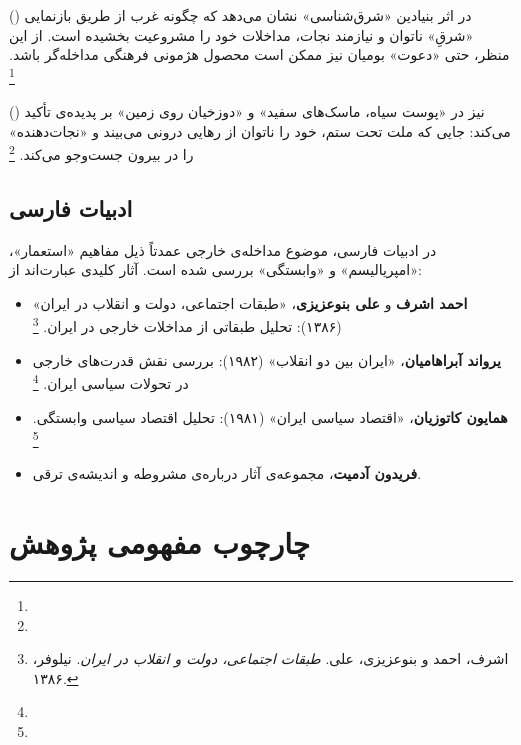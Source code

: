  () در اثر بنیادین «شرق‌شناسی» نشان می‌دهد که چگونه غرب از طریق بازنمایی «شرقِ» ناتوان و نیازمند نجات، مداخلات خود را مشروعیت بخشیده است. از این منظر، حتی «دعوت» بومیان نیز ممکن است محصول هژمونی فرهنگی مداخله‌گر باشد.%
\footnote{}

 () نیز در «پوست سیاه، ماسک‌های سفید» و «دوزخیان روی زمین» بر پدیده‌ی  تأکید می‌کند: جایی که ملت تحت ستم، خود را ناتوان از رهایی درونی می‌بیند و «نجات‌دهنده» را در بیرون جست‌وجو می‌کند.%
\footnote{}

\subsection{ادبیات فارسی}
\label{subsec:ch01-lit-persian}

در ادبیات فارسی، موضوع مداخله‌ی خارجی عمدتاً ذیل مفاهیم «استعمار»، «امپریالیسم» و «وابستگی» بررسی شده است. آثار کلیدی عبارت‌اند از:

\begin{itemize}[nosep, rightmargin=1em]
  \item \textbf{احمد اشرف} و \textbf{علی بنوعزیزی}،  «طبقات اجتماعی، دولت و انقلاب در ایران» (۱۳۸۶): تحلیل طبقاتی از مداخلات خارجی در ایران.%
  \footnote{اشرف، احمد و بنوعزیزی، علی. \textit{طبقات اجتماعی، دولت و انقلاب در ایران}. نیلوفر، ۱۳۸۶.}
  \item \textbf{یرواند آبراهامیان}، «ایران بین دو انقلاب» (۱۹۸۲): بررسی نقش قدرت‌های خارجی در تحولات سیاسی ایران.%
  \footnote{}
  \item \textbf{همایون کاتوزیان}، «اقتصاد سیاسی ایران» (۱۹۸۱): تحلیل اقتصاد سیاسی وابستگی.%
  \footnote{}
  \item \textbf{فریدون آدمیت}، مجموعه‌ی آثار درباره‌ی مشروطه و اندیشه‌ی ترقی.
\end{itemize}

\section{چارچوب مفهومی پژوهش}
\label{sec:ch01-framework}

